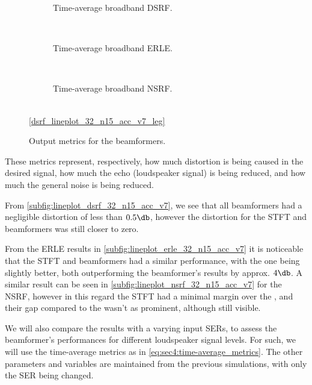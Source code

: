 
\begin{figure}[!ht]
	\begin{subfigure}{\textwidth}
		\centering
		
		\caption{Time-average broadband DSRF.}
		\label{subfig:lineplot_dsrf_32_avg_acc_v7}
	\end{subfigure}\\[1em]
	\begin{subfigure}{\textwidth}
		\centering
		
		\caption{Time-average broadband ERLE.}
		\label{subfig:lineplot_erle_32_avg_acc_v7}
	\end{subfigure}\\[1em]
	\begin{subfigure}{\textwidth}
		\centering
		
		\caption{Time-average broadband NSRF.}
		\label{subfig:lineplot_nsrf_32_avg_acc_v7}
	\end{subfigure}\\[1em]
	\centering\ref*{dsrf_lineplot_32_n15_acc_v7_leg}
	\caption{Output metrics for the beamformers.}
	\label{fig:lineplots_32_avg_acc_v7}
\end{figure}

These metrics represent, respectively, how much distortion is being caused in the desired signal, how much the echo (loudspeaker signal) is being reduced, and how much the general noise is being reduced.

From \cref{subfig:lineplot_dsrf_32_n15_acc_v7}, we see that all beamformers had a negligible distortion of less than $0.5\dB$, however the distortion for the STFT and \tssbt{} beamformers was still closer to zero.

From the ERLE results in \cref{subfig:lineplot_erle_32_n15_acc_v7} it is noticeable that the STFT and \nssbt{} beamformers had a similar performance, with the \tssbt{} one being slightly better, both outperforming the \nssbt{} beamformer's results by approx. $4\dB$. A similar result can be seen in \cref{subfig:lineplot_nsrf_32_n15_acc_v7} for the NSRF, however in this regard the STFT had a minimal margin over the \tssbt{}, and their gap compared to the \nssbt{} wasn't as prominent, although still visible.

We will also compare the results with a varying input SERs, to assess the beamformer's performances for different loudspeaker signal levels. For such, we will use the time-average metrics as in \cref{eq:sec4:time-average_metrics}. The other parameters and variables are maintained from the previous simulations, with only the SER being changed.

